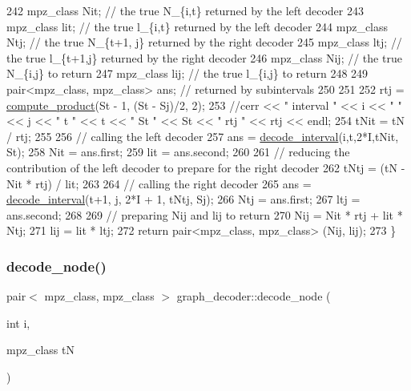 \begin{DoxyCode}
242   mpz\_class Nit; \textcolor{comment}{// the true N\_\{i,t\} returned by the left decoder}
243   mpz\_class lit; \textcolor{comment}{// the true l\_\{i,t\} returned by the left decoder}
244   mpz\_class Ntj; \textcolor{comment}{// the true N\_\{t+1, j\} returned by the right decoder}
245   mpz\_class ltj; \textcolor{comment}{// the true l\_\{t+1,j\} returned by the right decoder}
246   mpz\_class Nij; \textcolor{comment}{// the true N\_\{i,j\} to return}
247   mpz\_class lij; \textcolor{comment}{// the true l\_\{i,j\} to return}
248 
249   pair<mpz\_class, mpz\_class> ans; \textcolor{comment}{// returned by subintervals }
250 
251 
252   rtj = \hyperlink{compression__helper_8cpp_ae2afb43aabe50f7d42aae8f82b5a35f4}{compute\_product}(St - 1, (St - Sj)/2, 2);
253   \textcolor{comment}{//cerr << " interval " << i << " " << j << " t " << t << " St " << St << " rtj " << rtj << endl;}
254   tNit = tN / rtj;
255 
256   \textcolor{comment}{// calling the left decoder }
257   ans = \hyperlink{classgraph__decoder_a2cb0bd279889a833d4c825e99eb72410}{decode\_interval}(i,t,2*I,tNit, St); 
258   Nit = ans.first;
259   lit = ans.second;
260 
261   \textcolor{comment}{// reducing the contribution of the left decoder to prepare for the right decoder}
262   tNtj = (tN - Nit * rtj) / lit;
263 
264   \textcolor{comment}{// calling the right decoder}
265   ans = \hyperlink{classgraph__decoder_a2cb0bd279889a833d4c825e99eb72410}{decode\_interval}(t+1, j, 2*I + 1, tNtj, Sj);
266   Ntj = ans.first;
267   ltj = ans.second;
268 
269   \textcolor{comment}{// preparing Nij and lij to return}
270   Nij = Nit * rtj + lit * Ntj;
271   lij = lit * ltj;
272   \textcolor{keywordflow}{return} pair<mpz\_class, mpz\_class> (Nij, lij);
273 \}
\end{DoxyCode}
\mbox{\label{classgraph__decoder_af3ff99a4de6035ad257ebd7c6519cdd8}} 
\subsubsection{\texorpdfstring{decode\+\_\+node()}{decode\_node()}}
{\footnotesize\ttfamily pair$<$ mpz\+\_\+class, mpz\+\_\+class $>$ graph\+\_\+decoder\+::decode\+\_\+node (\begin{DoxyParamCaption}\item[{int}]{i,  }\item[{mpz\+\_\+class}]{tN }\end{DoxyParamCaption})}



